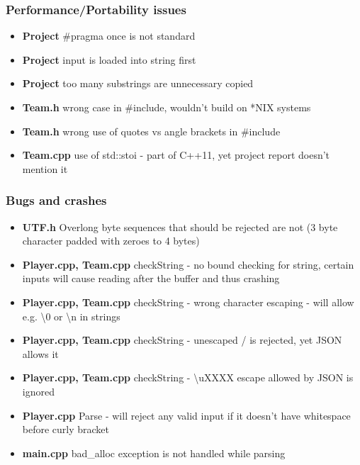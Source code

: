 \documentclass{beamer}
\begin{document}

\begin{frame}
\frametitle{Performance/Portability issues}

\begin{itemize}
\item \textbf{Project} \#pragma once is not standard
\item \textbf{Project} input is loaded into string first
\item \textbf{Project} too many substrings are unnecessary copied
\item \textbf{Team.h} wrong case in \#include, wouldn't build on *NIX systems
\item \textbf{Team.h} wrong use of quotes vs angle brackets in \#include
\item \textbf{Team.cpp} use of std::stoi - part of C++11, yet project report doesn't mention it
\end{itemize}

\end{frame}


\begin{frame}
\frametitle{Bugs and crashes}

\begin{itemize}
\item \textbf{UTF.h} Overlong byte sequences that should be rejected are not (3 byte character padded with zeroes to 4 bytes)
\item \textbf{Player.cpp, Team.cpp} checkString - no bound checking for string, certain inputs will cause reading after the buffer and thus crashing
\item \textbf{Player.cpp, Team.cpp} checkString - wrong character escaping - will allow e.g. \textbackslash 0 or \textbackslash n in strings
\item \textbf{Player.cpp, Team.cpp} checkString - unescaped / is rejected, yet JSON allows it
\item \textbf{Player.cpp, Team.cpp} checkString - \textbackslash uXXXX escape allowed by JSON is ignored
\item \textbf{Player.cpp} Parse - will reject any valid input if it doesn't have whitespace before curly bracket
\item \textbf{main.cpp} bad\_alloc exception is not handled while parsing
\end{itemize}

\end{frame}
\end{document}
